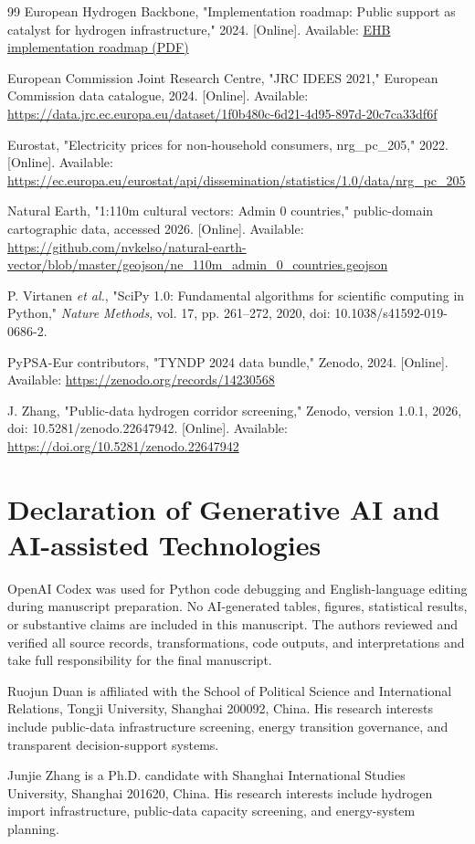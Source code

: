 \documentclass{ieeeaccess}
\begin{document}
\begin{thebibliography}{99}
European Hydrogen Backbone, "Implementation roadmap: Public support as catalyst for hydrogen infrastructure," 2024. [Online]. Available: \href{https://ehb.eu/files/downloads/1712733755_EHB-Implementation-Roadmap-Public-support-as-catalyst-for-hydrogen-infrastructure.pdf}{EHB implementation roadmap (PDF)}

European Commission Joint Research Centre, "JRC IDEES 2021," European Commission data catalogue, 2024. [Online]. Available: \url{https://data.jrc.ec.europa.eu/dataset/1f0b480c-6d21-4d95-897d-20c7ca33df6f}

Eurostat, "Electricity prices for non-household consumers, nrg\_pc\_205," 2022. [Online]. Available: \url{https://ec.europa.eu/eurostat/api/dissemination/statistics/1.0/data/nrg_pc_205}

Natural Earth, "1:110m cultural vectors: Admin 0 countries," public-domain cartographic data, accessed 2026. [Online]. Available: \url{https://github.com/nvkelso/natural-earth-vector/blob/master/geojson/ne_110m_admin_0_countries.geojson}

P. Virtanen \emph{et al.}, "SciPy 1.0: Fundamental algorithms for scientific computing in Python," \emph{Nature Methods}, vol. 17, pp. 261--272, 2020, doi: 10.1038/s41592-019-0686-2.

PyPSA-Eur contributors, "TYNDP 2024 data bundle," Zenodo, 2024. [Online]. Available: \url{https://zenodo.org/records/14230568}

J. Zhang, "Public-data hydrogen corridor screening," Zenodo, version 1.0.1, 2026, doi: 10.5281/zenodo.22647942. [Online]. Available: \url{https://doi.org/10.5281/zenodo.22647942}

\end{thebibliography}
\section*{Declaration of Generative AI and AI-assisted Technologies}
OpenAI Codex was used for Python code debugging and English-language editing during manuscript preparation. No AI-generated tables, figures, statistical results, or substantive claims are included in this manuscript. The authors reviewed and verified all source records, transformations, code outputs, and interpretations and take full responsibility for the final manuscript.

\begin{IEEEbiographynophoto}{Ruojun Duan}
is affiliated with the School of Political Science and International Relations, Tongji University, Shanghai 200092, China. His research interests include public-data infrastructure screening, energy transition governance, and transparent decision-support systems.
\end{IEEEbiographynophoto}

\begin{IEEEbiographynophoto}{Junjie Zhang}
is a Ph.D. candidate with Shanghai International Studies University, Shanghai 201620, China. His research interests include hydrogen import infrastructure, public-data capacity screening, and energy-system planning.
\end{IEEEbiographynophoto}

\EOD
\end{document}
